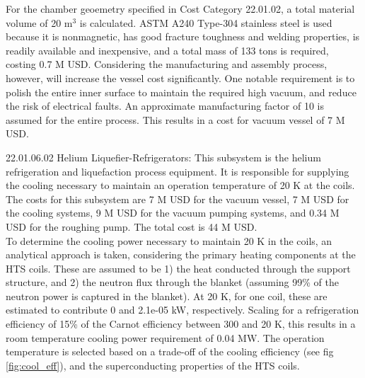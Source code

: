 For the chamber geoemetry specified in Cost Category 22.01.02, a total material volume of 20 m$^3$ is calculated. ASTM A240 Type-304 stainless steel is used because it is nonmagnetic, has good fracture toughness and welding properties, is readily available and inexpensive, and a total mass of 133 tons is required, costing 0.7 M USD. Considering the manufacturing and assembly process, however, will increase the vessel cost significantly. One notable requirement is to polish the entire inner surface to maintain the required high vacuum, and reduce the risk of electrical faults. An approximate manufacturing factor of 10 is assumed for the entire process. This results in a cost for vacuum vessel of 7 M USD.\\

\begin{table}[h]
    \centering
    \caption{Vacuum vessel parameters.}
    \label{tab:ves_params}
\end{table}



22.01.06.02 Helium Liquefier-Refrigerators: This subsystem is the helium refrigeration and liquefaction process equipment. It is responsible for supplying the cooling necessary to maintain an operation temperature of 20 K at the coils. \\

The costs for this subsystem are 7 M USD for the vacuum vessel, 7 M USD for the cooling systems, 9 M USD for the vacuum pumping systems, and 0.34 M USD for the roughing pump. The total cost is 44 M USD.\\

To determine the cooling power necessary to maintain 20 K in the coils, an analytical approach is taken, considering the primary heating components at the HTS coils. These are assumed to be 1) the heat conducted through the support structure, and 2) the neutron flux through the blanket (assuming 99\% of the neutron power is captured in the blanket). At 20 K, for one coil, these are estimated to contribute 0 and 2.1e-05 kW, respectively. Scaling for a refrigeration efficiency of 15\% of the Carnot efficiency between 300 and 20 K, this results in a room temperature cooling power requirement of 0.04 MW. The operation temperature is selected based on a trade-off of the cooling efficiency (see fig \ref{fig:cool_eff}), and the superconducting properties of the HTS coils.\\

